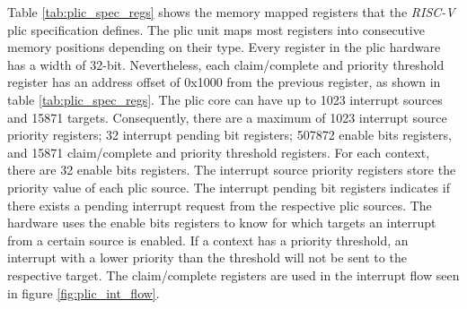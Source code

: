 Table \ref{tab:plic_spec_regs} shows the memory mapped registers that the \textit{RISC-V} \acrshort{plic} specification defines. The \acrshort{plic} unit maps most registers into consecutive memory positions depending on their type. Every register in the \acrshort{plic} hardware has a width of 32-bit. Nevertheless, each claim/complete and priority threshold register has an address offset of 0x1000 from the previous register, as shown in table \ref{tab:plic_spec_regs}. The \acrshort{plic} core can have up to 1023 interrupt sources and 15871 targets. Consequently, there are a maximum of 1023 interrupt source priority registers; 32 interrupt pending bit registers; 507872 enable bits registers, and 15871 claim/complete and priority threshold registers. For each context, there are 32 enable bits registers. The interrupt source priority registers store the priority value of each \acrshort{plic} source. The interrupt pending bit registers indicates if there exists a pending interrupt request from the respective \acrshort{plic} sources. The hardware uses the enable bits registers to know for which targets an interrupt from a certain source is enabled. If a context has a priority threshold, an interrupt with a lower priority than the threshold will not be sent to the respective target. The claim/complete registers are used in the interrupt flow seen in figure \ref{fig:plic_int_flow}.

